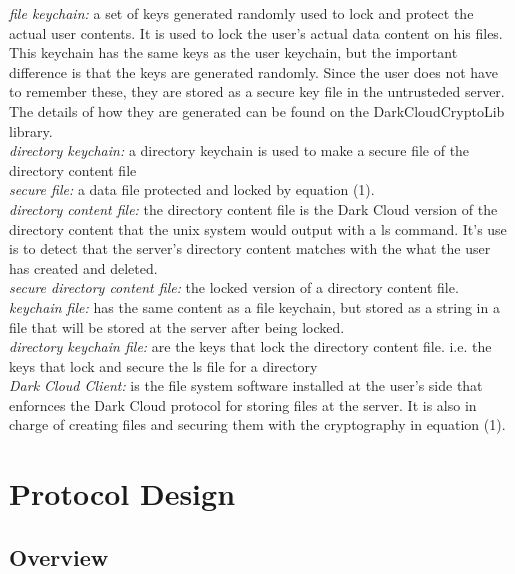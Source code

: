 \documentclass[a4paper]{article}
\begin{document}
{\it file keychain:} a set of keys generated randomly used to lock and protect the actual user contents. It is used to lock the user's actual data content on his files. This keychain has the same keys as the user keychain, but the important difference is that the keys are generated randomly. Since the user does not have to remember these, they are stored as a secure key file in the untrusteded server. The details of how they are generated can be found on the DarkCloudCryptoLib library.\\

{\it directory keychain:} a directory keychain is used to make a secure file of the directory content file\\

{\it secure file:} a data file protected and locked by equation (1).\\

{\it directory content file:} the directory content file is the Dark Cloud version of the directory content that the unix system would output with a ls command. It's use is to detect that the server's directory content matches with the what the user has created and deleted.\\

{\it secure directory content file:} the locked version of a directory content file.\\

{\it keychain file:} has the same content as a file keychain, but stored as a string in a file that will be stored at the server after being locked.\\

{\it directory keychain file:} are the keys that lock the directory content file. i.e. the keys that lock and secure the ls file for a directory\\

{\it Dark Cloud Client:} is the file system software installed at the user's side that enfornces the Dark Cloud protocol for storing files at the server. It is also in charge of creating files and securing them with the cryptography in equation (1).


\section{Protocol Design}

\label{Encryption}

\subsection{Overview}
\end{document}

